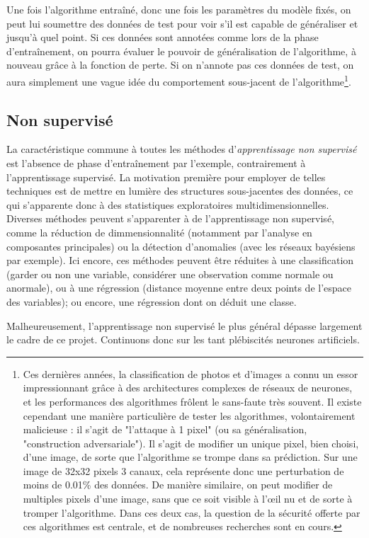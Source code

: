Une fois l'algorithme entraîné, donc une fois les paramètres du modèle fixés, on peut lui soumettre des données de test pour voir s'il est capable de généraliser et jusqu'à quel point. Si ces données sont annotées comme lors de la phase d'entraînement, on pourra évaluer le pouvoir de généralisation de l'algorithme, à nouveau grâce à la fonction de perte. Si on n'annote pas ces données de test, on aura simplement une vague idée du comportement sous-jacent de l'algorithme\footnote{Ces dernières années, la classification de photos et d'images a connu un essor impressionnant grâce à des architectures complexes de réseaux de neurones, et les performances des algorithmes frôlent le sans-faute très souvent. Il existe cependant une manière particulière de tester les algorithmes, volontairement malicieuse : il s'agit de "l'attaque à 1 pixel" (ou sa généralisation, "construction adversariale"). Il s'agit de modifier un unique pixel, bien choisi, d'une image, de sorte que l'algorithme se trompe dans sa prédiction. Sur une image de 32x32 pixels 3 canaux, cela représente donc une perturbation de moins de 0.01\% des données. De manière similaire, on peut modifier de multiples pixels d'une image, sans que ce soit visible à l'œil nu et de sorte à tromper l'algorithme. Dans ces deux cas, la question de la sécurité offerte par ces algorithmes est centrale, et de nombreuses recherches sont en cours.}.

\subsection{Non supervisé}
La caractéristique commune à toutes les méthodes d'\emph{apprentissage non supervisé} est l'absence de phase d'entraînement par l'exemple, contrairement à l'apprentissage supervisé. La motivation première pour employer de telles techniques est de mettre en lumière des structures sous-jacentes des données, ce qui s'apparente donc à des statistiques exploratoires multidimensionnelles. Diverses méthodes peuvent s'apparenter à de l'apprentissage non supervisé, comme la réduction de dimmensionnalité (notamment par l'analyse en composantes principales) ou la détection d'anomalies (avec les réseaux bayésiens par exemple). Ici encore, ces méthodes peuvent être réduites à une classification (garder ou non une variable, considérer une observation comme normale ou anormale), ou à une régression (distance moyenne entre deux points de l'espace des variables); ou encore, une régression dont on déduit une classe. 

Malheureusement, l'apprentissage non supervisé le plus général dépasse largement le cadre de ce projet. Continuons donc sur les tant plébiscités neurones artificiels.


